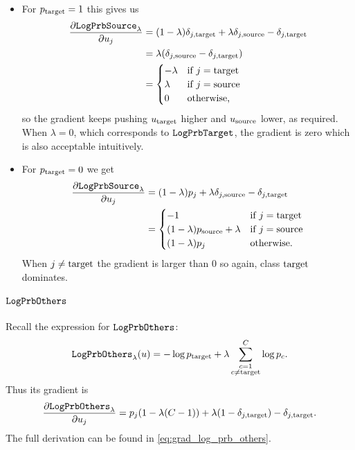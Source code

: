 \documentclass[../main.tex]{subfiles}
\begin{document}
\begin{itemize}
    \item For $p_{\mathrm{target}} = 1$ this gives us
          \begin{align*}
              \frac{\partial \mathtt{LogPrbSource}_{\lambda}}{\partial u_j}
               & = (1 - \lambda) \delta_{j, \mathrm{target}} + \lambda \delta_{j, \mathrm{source}} - \delta_{j, \mathrm{target}} \\
               & = \lambda(\delta_{j, \mathrm{source}} - \delta_{j, \mathrm{target}})                     \\
               & = \begin{cases}
                       -\lambda & \text{if } j = \mathrm{target} \\
                       \lambda  & \text{if } j = \mathrm{source} \\
                       0        & \text{otherwise,}
                   \end{cases}
          \end{align*}
          so the gradient keeps pushing $u_{\mathrm{target}}$ higher and $u_{\mathrm{source}}$ lower, as required.
          When $\lambda = 0$, which corresponds to $\mathtt{LogPrbTarget}$, the gradient is zero which is also acceptable intuitively.

    \item For $p_{\mathrm{target}} = 0$ we get
          \begin{align*}
              \frac{\partial \mathtt{LogPrbSource}_{\lambda}}{\partial u_j}
               & = (1 - \lambda) p_j + \lambda \delta_{j, \mathrm{source}} - \delta_{j, \mathrm{target}}                 \\
               & = \begin{cases}
                       -1                             & \text{if } j = \mathrm{target} \\
                       (1-\lambda)p_{\mathrm{source}} + \lambda & \text{if } j = \mathrm{source} \\
                       (1 - \lambda) p_j              & \text{otherwise.}
                   \end{cases}
          \end{align*}
          When $j \neq \mathrm{target}$ the gradient is larger than 0 so again, class $\mathrm{target}$ dominates.
\end{itemize}

\paragraph{$\mathtt{LogPrbOthers}_{}$}

Recall the expression for $\mathtt{LogPrbOthers}_{}$:
\begin{align*}
    \mathtt{LogPrbOthers}_{\lambda}(u) = - \log p_{\mathrm{target}} + \lambda \sum_{\substack{{c}=1 \\ {c} \neq \mathrm{target}}}^C \log p_c.
\end{align*}
Thus its gradient is
\begin{align*}
    \frac{\partial \mathtt{LogPrbOthers}_{\lambda}}{\partial u_j}
     = p_j (1 - \lambda (C - 1)) + \lambda (1 - \delta_{j, \mathrm{target}}) - \delta_{j, \mathrm{target}}.
\end{align*}
The full derivation can be found in \autoref{eq:grad_log_prb_others}.
\end{document}
